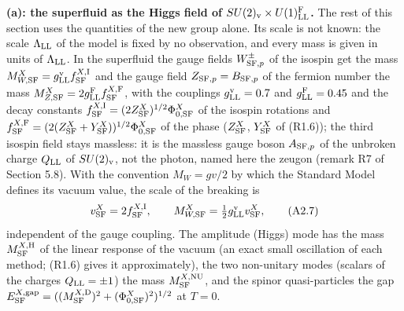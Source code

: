 \documentclass[
  10pt,
]{article}
\begin{document}
\textbf{(a): the superfluid as the Higgs field of
\(SU(2)_{\rm v}\times U(1)^{\rm F}_{\rm LL}\).} The rest of this section
uses the quantities of the new group alone. Its scale is not known: the
scale \(\Lambda_{\rm LL}\) of the model is fixed by no observation, and
every mass is given in units of \(\Lambda_{\rm LL}\). In the superfluid
the gauge fields \(W^\pm_{{\rm SF},p}\) of the isospin get the mass
\(M^X_{W,{\rm SF}}=g^{\rm v}_{\rm LL}f^{X,{\rm I}}_{\rm SF}\) and the
gauge field \(Z_{{\rm SF},p}=B_{{\rm SF},p}\) of the fermion number the
mass \(M^X_{Z,{\rm SF}}=2g^{\rm F}_{\rm LL}f^{X,{\rm F}}_{\rm SF}\),
with the couplings \(g^{\rm v}_{\rm LL}=0.7\) and
\(g^{\rm F}_{\rm LL}=0.45\) and the decay constants
\(f^{X,{\rm I}}_{\rm SF}=(2Z^X_{\rm SF})^{1/2}\Phi^X_{0,{\rm SF}}\) of
the isospin rotations and
\(f^{X,{\rm F}}_{\rm SF}=(2(Z^X_{\rm SF}+Y^X_{\rm SF}))^{1/2}\Phi^X_{0,{\rm SF}}\)
of the phase (\(Z^X_{\rm SF}\), \(Y^X_{\rm SF}\) of (R1.6)); the third
isospin field stays massless: it is the massless gauge boson
\(A_{{\rm SF},p}\) of the unbroken charge \(Q_{\rm LL}\) of
\(SU(2)_{\rm v}\), not the photon, named here the zeugon (remark R7 of
Section 5.8). With the convention \(M_W=gv/2\) by which the Standard
Model defines its vacuum value, the scale of the breaking is
\[v^X_{\rm SF}=2f^{X,{\rm I}}_{\rm SF},\qquad M^X_{W,{\rm SF}}=\tfrac12g^{\rm v}_{\rm LL}v^X_{\rm SF},\tag{A2.7}\]
independent of the gauge coupling. The amplitude (Higgs) mode has the
mass \(M^{X,{\rm H}}_{\rm SF}\) of the linear response of the vacuum (an
exact small oscillation of each method; (R1.6) gives it approximately),
the two non-unitary modes (scalars of the charges \(Q_{\rm LL}=\pm1\))
the mass \(M^{X,{\rm NU}}_{\rm SF}\), and the spinor quasi-particles the
gap
\(E^{X,{\rm gap}}_{\rm SF}=((M^{X,{\rm D}}_{\rm SF})^2+(\Phi^X_{0,{\rm SF}})^2)^{1/2}\)
at \(T=0\).
\end{document}

